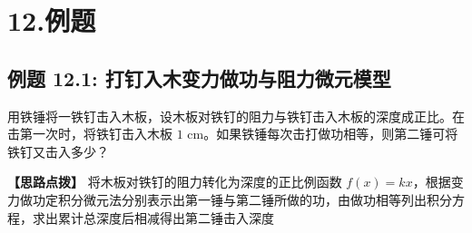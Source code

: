 \documentclass[11pt,a4paper,UTF8]{ctexart}
\begin{document}
\pagestyle{fancy}
\fancyhf{}
\fancyhead[R]{\small\color{TitlePurple}\nouppercase{\leftmark}}
\renewcommand{\headrulewidth}{0.5pt}

\tableofcontents
\newpage
{}


\section{12.例题}


\subsection{例题 12.1: 打钉入木变力做功与阻力微元模型}

用铁锤将一铁钉击入木板，设木板对铁钉的阻力与铁钉击入木板的深度成正比。在击第一次时，将铁钉击入木板 $1\text{ cm}$。如果铁锤每次击打做功相等，则第二锤可将铁钉又击入多少？

\textbf{\color{DeepPurple}【思路点拨】} 将木板对铁钉的阻力转化为深度的正比例函数 $f(x) = kx$，根据变力做功定积分微元法分别表示出第一锤与第二锤所做的功，由做功相等列出积分方程，求出累计总深度后相减得出第二锤击入深度
\end{document}
